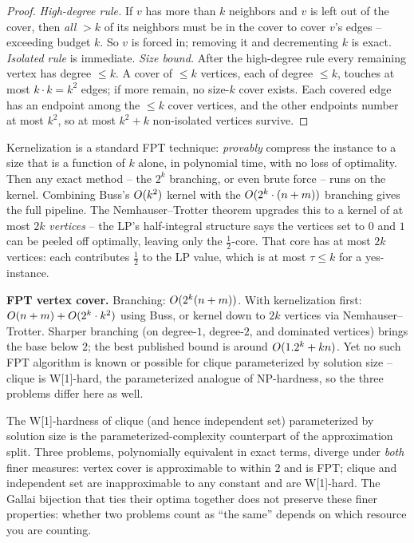 \begin{proof}
\emph{High-degree rule.} If $v$ has more than $k$ neighbors and $v$ is left out
of the cover, then \emph{all} $>k$ of its neighbors must be in the cover to cover
$v$'s edges -- exceeding budget $k$. So $v$ is forced in; removing it and
decrementing $k$ is exact. \emph{Isolated rule} is immediate. \emph{Size bound.}
After the high-degree rule every remaining vertex has degree $\le k$. A cover of
$\le k$ vertices, each of degree $\le k$, touches at most $k\cdot k=k^2$ edges; if
more remain, no size-$k$ cover exists. Each covered edge has an endpoint among the
$\le k$ cover vertices, and the other endpoints number at most $k^2$, so at most
$k^2+k$ non-isolated vertices survive.
\end{proof}

\begin{focusbox}
Kernelization is a standard FPT technique: \emph{provably} compress the instance to
a size that is a function of $k$ alone, in polynomial time, with no loss of
optimality. Then any exact method -- the $2^k$ branching, or even brute force --
runs on the kernel. Combining Buss's $O(k^2)$ kernel with the
$O(2^k\cdot(n+m))$ branching gives the full pipeline. The Nemhauser--Trotter
theorem upgrades this to a kernel of at most $2k$ \emph{vertices} -- the LP's
half-integral structure says the vertices set to $0$ and $1$ can be peeled off
optimally, leaving only the $\tfrac12$-core. That core has at most $2k$
vertices: each contributes $\tfrac12$ to the LP value, which is at most
$\tau\le k$ for a yes-instance.
\end{focusbox}

\begin{complexitybox}
\textbf{FPT vertex cover.} Branching: $O(2^k(n+m))$. With kernelization first:
$O(n+m)+O(2^k\cdot k^2)$ using Buss, or kernel down to $2k$ vertices via
Nemhauser--Trotter. Sharper branching (on degree-$1$, degree-$2$, and dominated
vertices) brings the base below $2$; the best published bound is around
$O(1.2^k+kn)$. Yet no such FPT algorithm is known or possible for clique
parameterized by solution size -- clique is W[1]-hard, the parameterized analogue
of NP-hardness, so the three problems differ here as well.
\end{complexitybox}

\begin{connectionbox}
The W[1]-hardness of clique (and hence independent set) parameterized by solution
size is the parameterized-complexity counterpart of the approximation split. Three
problems, polynomially equivalent in exact terms, diverge under \emph{both}
finer measures: vertex cover is approximable to within $2$ and is FPT; clique and
independent set are inapproximable to any constant and are W[1]-hard. The Gallai
bijection that ties their optima together does not preserve these finer properties:
whether two problems count as ``the same'' depends on which resource you
are counting.
\end{connectionbox}

